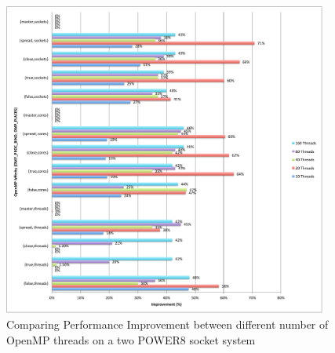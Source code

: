 \begin{figure}[h!]
  \centering
  \includegraphics[height=1\textwidth, width=0.95\textwidth]{./Images/ImpAllV.pdf}
       \caption{Comparing Performance Improvement between different number of OpenMP threads on a two POWER8 socket system}
       \label{fig:imp}
\end{figure}

